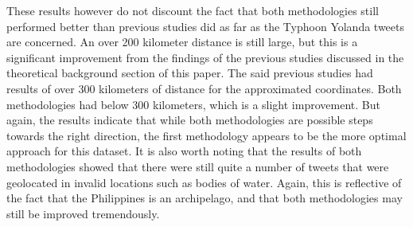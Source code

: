 These results however do not discount the fact that both methodologies still performed better than previous studies did as far as the Typhoon Yolanda tweets are concerned. An over 200 kilometer distance is still large, but this is a significant improvement from the findings of the previous studies discussed in the theoretical background section of this paper. The said previous studies had results of over 300 kilometers of distance for the approximated coordinates. Both methodologies had below 300 kilometers, which is a slight improvement. But again, the results indicate that while both methodologies are possible steps towards the right direction, the first methodology appears to be the more optimal approach for this dataset. It is also worth noting that the results of both methodologies showed that there were still quite a number of tweets that were geolocated in invalid locations such as bodies of water. Again, this is reflective of the fact that the Philippines is an archipelago, and that both methodologies may still be improved tremendously. 